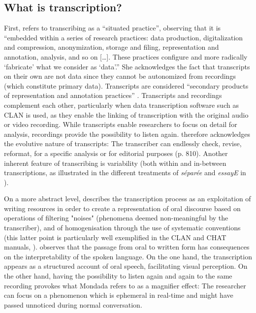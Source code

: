 \documentclass[output=paper,colorlinks,citecolor=brown,modfonts,nonflat]{../langscibook}
\begin{document}
\subsection{ \textbf{What is transcription?}}%

First, \citet[810]{Mondada2007} refers to transcribing as a “situated practice”, observing that it is “embedded within a series of research practices: data production, digitalization and compression, anonymization, storage and filing, representation and annotation, analysis, and so on […]. These practices configure and more radically ‘fabricate’ what we consider as ‘data’.” She acknowledges the fact that transcripts on their own are not data since they cannot be autonomized from recordings (which constitute primary data). Transcripts are considered “secondary products of representation and annotation practices” \citep[810--811]{Mondada2007}. Transcripts and recordings complement each other, particularly when data transcription software such as CLAN is used, as they enable the linking of transcription with the original audio or video recording. While transcripts enable researchers to focus on detail for analysis, recordings provide the possibility to listen again. \citeauthor{Mondada2007} therefore acknowledges the evolutive nature of transcripts: The transcriber can endlessly check, revise, reformat, for a specific analysis or for editorial purposes (p. 810). Another inherent feature of transcribing is variability (both within and in-between transcriptions, as illustrated in the different treatments of \textit{séparée} and \textit{essayE} in ).

On a more abstract level, \citet{Mondada2000} describes the transcription process as an exploitation of writing resources in order to create a representation of oral discourse based on operations of filtering "noises" (phenomena deemed non-meaningful by the transcriber), and of homogenisation through the use of systematic conventions (this latter point is particularly well exemplified in the CLAN and CHAT manuals, \citealt{MacWhinney2000}). \citet{Mondada2000} observes that the passage from oral to written form has consequences on the interpretability of the spoken language. On the one hand, the transcription appears as a structured account of oral speech, facilitating visual perception. On the other hand, having the possibility to listen again and again to the same recording provokes what Mondada refers to as a magnifier effect: The researcher can focus on a phenomenon which is ephemeral in real-time and might have passed unnoticed during normal conversation.
\end{document}
